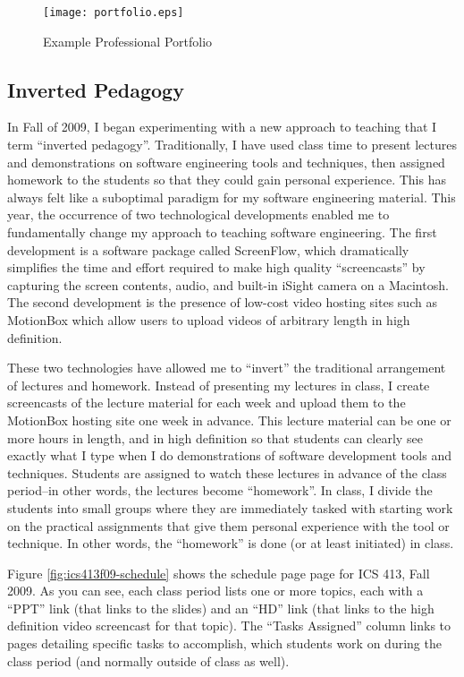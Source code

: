 \documentclass[11pt]{article}
\begin{document}
 \begin{figure*}[ht]
  \center
  \texttt{[image: portfolio.eps]}
  \caption{Example Professional Portfolio}
  \label{fig:portfolio}
\end{figure*}  




\subsection{Inverted Pedagogy}

In Fall of 2009, I began experimenting with a new approach to teaching that
I term ``inverted pedagogy''.  Traditionally, I have used class time to
present lectures and demonstrations on software engineering tools and
techniques, then assigned homework to the students so that they could gain
personal experience.  This has always felt like a suboptimal paradigm for
my software engineering material.  This year, the occurrence of two
technological developments enabled me to fundamentally change my approach
to teaching software engineering. The first development is a software
package called ScreenFlow, which dramatically simplifies the time and
effort required to make high quality ``screencasts'' by capturing the
screen contents, audio, and built-in iSight camera on a Macintosh.  The
second development is the presence of low-cost  video
hosting sites such as MotionBox which allow users to upload videos of
arbitrary length in high definition.  

These two technologies have allowed me to ``invert'' the traditional
arrangement of lectures and homework.  Instead of presenting my lectures in
class, I create screencasts of the lecture material for each week and
upload them to the MotionBox hosting site one week in advance.  This
lecture material can be one or more hours in length, and in high definition
so that students can clearly see exactly what I type when I do demonstrations of
software development tools and techniques.  Students are assigned to watch
these lectures in advance of the class period--in other words, the lectures
become ``homework''.   In class, I divide the students into small groups
where they are immediately tasked with starting work on the practical
assignments that give them personal experience with the tool or technique.
In other words, the ``homework'' is done (or at least initiated)  in class.

Figure \ref{fig:ics413f09-schedule} shows the schedule page page for ICS
413, Fall 2009.  As you can see, each class period lists one or more
topics, each with a ``PPT'' link (that links to the slides) and an ``HD''
link (that links to the high definition video screencast for that topic).
The ``Tasks Assigned'' column links to pages detailing specific tasks to
accomplish, which students work on during the class period (and normally
outside of class as well). 
\end{document}
